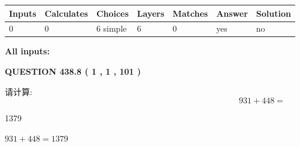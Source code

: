 \documentclass{ctexart}
\begin{document}
 
\noindent{}
 
 
   
   
   
   
\noindent\begin{tabular}{|l|l|l|l|l|l|l|}
 \hline
Inputs & Calculates & Choices & Layers & Matches & Answer & Solution \\ \hline
 0  & 
 0  & 
 6
  simple  
  & 
 6  & 
 0  & 
  yes & 
  no 
  \\ \hline
 \end{tabular}
   
   
   
   
\noindent{}
   
   
   
   
\noindent\vspace{0.1in}\hspace{-0.08in} {\textbf{\Large{All inputs: }}}
   
   
  
\vspace{0.2in}
  
{\textbf{\Large{QUESTION
438.8 
 ( 1 , 1 , 101 )
}}}
  
  
 
请计算:
\begin{equation}
931 +  %
448 = \nonumber
\end{equation}
 
 
 
\noindent{}
 
 

1379
 
 
\noindent{}
 
 

 
 
 
\noindent{}
 
 

$ %
931 +  %
448=   %
1379$
 
 
\noindent{}
 
 

 
   
\end{document}
